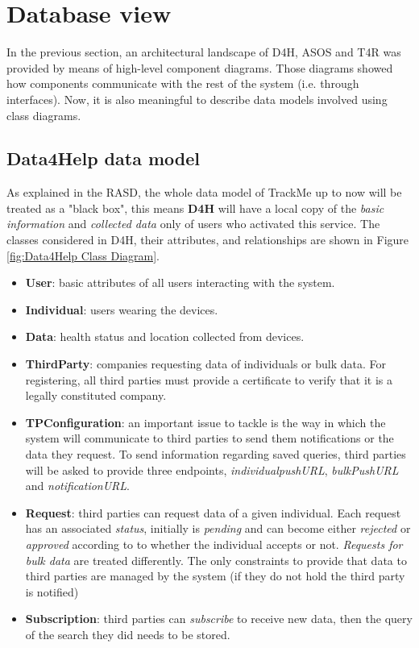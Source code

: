 \documentclass[a4paper, hidelinks, 12pt]{report}
\begin{document}
	\section{Database view}
In the previous section, an architectural landscape of D4H, ASOS and T4R was provided by means of high-level component diagrams. Those diagrams showed how components communicate with the rest of the system (i.e. through interfaces). Now, it is also meaningful to describe data models involved using class diagrams. 
	
	\subsection{Data4Help data model}
	As explained in the RASD, the whole data model of TrackMe up to now will be treated as a "black box", this means \textbf{D4H} will have a local copy of the \textit{basic information} and \textit{collected data} only of users who activated this service. The classes considered in D4H, their attributes, and relationships are shown in Figure \ref{fig:Data4Help Class Diagram}.
	
	\begin{itemize}
		\item{\textbf{User}}: basic attributes of all users interacting with the system.
		\item{\textbf{Individual}}: users wearing the devices.
		\item{\textbf{Data}}: health status and location collected from devices.
		\item{\textbf{ThirdParty}}: companies requesting data of individuals or bulk data. For registering, all third parties must provide a certificate to verify that it is a legally constituted company.
		\item{\textbf{TPConfiguration}}: an important issue to tackle is the way in which the system will communicate to third parties to send them notifications or the data they request. To send information regarding saved queries, third parties will be asked to provide three endpoints,
	 \textit{individualpushURL}, \textit{bulkPushURL} and \textit{notificationURL}.
		\item{\textbf{Request}}: third parties can request data of a given individual. Each request has an associated \textit{status}, initially is \textit{pending} and can become either \textit{rejected} or \textit{approved} according to to whether the individual accepts or not. 
		\textit{Requests for bulk data} are treated differently. The only constraints to provide that data to third parties are managed by the system (if they do not hold the third party is notified)
		\item{\textbf{Subscription}}:  third parties can \textit{subscribe} to receive new data, then the query of the search they did needs to be stored. \\
	\end{itemize}
\end{document}
